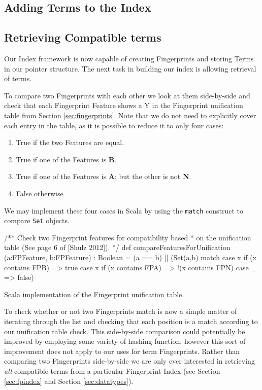 \subsection{Adding Terms to the Index}

\subsection{Retrieving Compatible terms}

Our Index framework is now capable of creating Fingerprints and storing Terms in
our pointer structure. The next task in building our index is allowing retrieval
of terms.

To compare two Fingerprints with each other we look at them side-by-side and check
that each Fingerprint Feature shows a Y in the Fingerprint unification table from Section \ref{sec:fingerprints}.
Note that we do not need to explicitly cover each entry in the table, as it is possible
to reduce it to only four cases:
\begin{enumerate}
\item True if the two Features are equal.
\item True if one of the Features is \textbf{B}.
\item True if one of the Features is \textbf{A}; but the other is not \textbf{N}.
\item False otherwise 
\end{enumerate}
We may implement these four cases in Scala by using the \verb!match! construct
to compare \verb!Set! objects.
\begin{listing}[H]
\begin{scalacode}
 /** Check two Fingerprint features for compatibility based
   * on the unification table (See page 6 of [Shulz 2012]). */
  def compareFeaturesForUnification
         (a:FPFeature, b:FPFeature) : Boolean =
  (a == b) || 
  (Set(a,b) match {
    case x if (x contains FPB) => true
    case x if (x contains FPA) => !(x contains FPN)
    case _ => false})
\end{scalacode}
\caption{Scala implementation of the Fingerprint unification table. \protect\cite[p6]{shulz12}}
\label{lst:unitable}
\end{listing}

To check whether or not two Fingerprints match is now a simple matter of iterating
through the list and checking that each position is a match according to our unification
table check. This side-by-side comparison could potentially be improved by employing
some variety of hashing function; however this sort of improvement does not
apply to our uses for term Fingerprints. Rather than comparing two Fingerprints
side-by-side we are only ever interested in retrieving \emph{all} compatible
terms from a particular Fingerprint Index (see Section \ref{sec:fpindex}
and Section \ref{sec:datatypes}).

